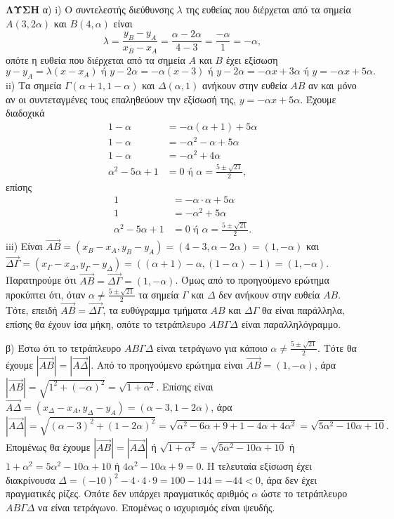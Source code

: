 \textbf{ΛΥΣΗ}
α)
i) Ο συντελεστής διεύθυνσης $\lambda$ της ευθείας που διέρχεται από τα σημεία $A(3,2\alpha)$ και $B(4,\alpha)$ είναι
\[
\lambda = \frac{y_B - y_A}{x_B - x_A} = \frac{\alpha - 2\alpha}{4 - 3} = \frac{-\alpha}{1} = -\alpha,
\]
οπότε η ευθεία που διέρχεται από τα σημεία $A$ και $B$ έχει εξίσωση
\[
y - y_A = \lambda(x - x_A) \text{ ή } y - 2\alpha = -\alpha(x - 3) \text{ ή } y - 2\alpha = -\alpha x + 3\alpha \text{ ή } y = -\alpha x + 5\alpha.
\]
ii) Τα σημεία $\Gamma(\alpha + 1, 1 - \alpha)$ και $\Delta(\alpha, 1)$ ανήκουν στην ευθεία $AB$ αν και μόνο αν οι συντεταγμένες τους επαληθεύουν την εξίσωσή της, $y = -\alpha x + 5\alpha$. Έχουμε διαδοχικά
\begin{align*}
1 - \alpha &= -\alpha(\alpha + 1) + 5\alpha \\
1 - \alpha &= -\alpha^2 - \alpha + 5\alpha \\
1 - \alpha &= -\alpha^2 + 4\alpha \\
\alpha^2 - 5\alpha + 1 &= 0 \text{ ή } \alpha = \frac{5 \pm \sqrt{21}}{2},
\end{align*}
επίσης
\begin{align*}
1 &= -\alpha \cdot \alpha + 5\alpha \\
1 &= -\alpha^2 + 5\alpha \\
\alpha^2 - 5\alpha + 1 &= 0 \text{ ή } \alpha = \frac{5 \pm \sqrt{21}}{2}.
\end{align*}
iii) Είναι $\vec{AB} = (x_B - x_A, y_B - y_A) = (4 - 3, \alpha - 2\alpha) = (1, -\alpha)$ και
$\vec{\Delta\Gamma} = (x_\Gamma - x_\Delta, y_\Gamma - y_\Delta) = ((\alpha + 1) - \alpha, (1 - \alpha) - 1) = (1, -\alpha)$.
Παρατηρούμε ότι $\vec{AB} = \vec{\Delta\Gamma} = (1, -\alpha)$. Όμως από το προηγούμενο ερώτημα προκύπτει ότι, όταν $\alpha \neq \frac{5 \pm \sqrt{21}}{2}$ τα σημεία $\Gamma$ και $\Delta$ δεν ανήκουν στην ευθεία $AB$. Τότε, επειδή $\vec{AB} = \vec{\Delta\Gamma}$, τα ευθύγραμμα τμήματα $AB$ και $\Delta\Gamma$ θα είναι παράλληλα, επίσης θα έχουν ίσα μήκη, οπότε το τετράπλευρο $AB\Gamma\Delta$ είναι παραλληλόγραμμο.

β) Έστω ότι το τετράπλευρο $AB\Gamma\Delta$ είναι τετράγωνο για κάποιο $\alpha \neq \frac{5 \pm \sqrt{21}}{2}$. Τότε θα έχουμε $|\vec{AB}| = |\vec{A\Delta}|$. Από το προηγούμενο ερώτημα είναι $\vec{AB} = (1, -\alpha)$, άρα $|\vec{AB}| = \sqrt{1^2 + (-\alpha)^2} = \sqrt{1 + \alpha^2}$. Επίσης είναι $\vec{A\Delta} = (x_\Delta - x_A, y_\Delta - y_A) = (\alpha - 3, 1 - 2\alpha)$, άρα
\[
|\vec{A\Delta}| = \sqrt{(\alpha - 3)^2 + (1 - 2\alpha)^2} = \sqrt{\alpha^2 - 6\alpha + 9 + 1 - 4\alpha + 4\alpha^2} = \sqrt{5\alpha^2 - 10\alpha + 10}.
\]
Επομένως θα έχουμε $|\vec{AB}| = |\vec{A\Delta}|$ ή $\sqrt{1 + \alpha^2} = \sqrt{5\alpha^2 - 10\alpha + 10}$ ή $1 + \alpha^2 = 5\alpha^2 - 10\alpha + 10$ ή $4\alpha^2 - 10\alpha + 9 = 0$.
Η τελευταία εξίσωση έχει διακρίνουσα $\Delta = (-10)^2 - 4 \cdot 4 \cdot 9 = 100 - 144 = -44 < 0$, άρα δεν έχει πραγματικές ρίζες. Οπότε δεν υπάρχει πραγματικός αριθμός $\alpha$ ώστε το τετράπλευρο $AB\Gamma\Delta$ να είναι τετράγωνο. Επομένως ο ισχυρισμός είναι ψευδής.
\endlysh
